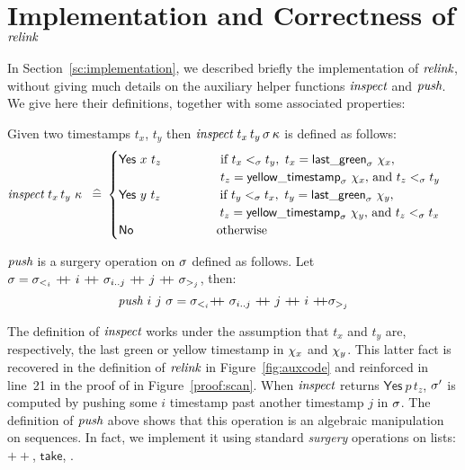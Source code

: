 \section{Implementation and Correctness of $\textit{relink}$}
\label{sc:relink-lemmas}
\def\cat{{\mathrel{+\!\!+}}}

In Section~\ref{sc:implementation}, we described briefly the
implementation of $\textit{relink}$, without giving much details on the
auxiliary helper functions $\textit{inspect}$ and $\textit{push}$. We give
here their definitions, together with some associated properties:

\begin{definition}[inspect]\label{def:inspect}%
Given two timestamps $t_x$, $t_y$ then $\textit{inspect}\ t_x\, t_y\,
\sigma\, \kappa$ is defined as follows:
\begin{equation*}
\aux{inspect}\ t_x\, t_y\ \C\ \eqdef
\begin{cases}
  \mathsf{Yes}\ x\ t_z\ \qquad \qquad
      \begin{array}[t]{l}
      \textrm{if}\ t_x \tle t_y,\ t_x = \mathsf{last\_green}_\ordlist\ \histx, \\
       t_z = \mathsf{yellow\_timestamp}_\ordlist\ \histx,\,
       \textrm{and} \ t_z \tle t_y
      \end{array} \\[5pt]
  \mathsf{Yes}\ y\ t_z\ \qquad \qquad
      \begin{array}[t]{l}
      \textrm{if}\ t_y \tle t_x,\ t_y = \mathsf{last\_green}_\ordlist\ \histy, \\
       t_z = \mathsf{yellow\_timestamp}_\ordlist\ \histy,\,
       \textrm{and} \ t_z \tle t_x
      \end{array} \\[5pt]
  \mathsf{No}\hphantom{\mathsf{s}\ x\ t_z}\ \qquad \qquad \textrm{otherwise}
\end{cases}
\end{equation*}
\end{definition}

\begin{definition}[push]\label{def:push}%
 $\textit{push}$ is a surgery operation on $\sigma$ defined as
  follows. Let $ \ordlist = \ordlist_{<_i}\ \cat
  \ i\ \cat\ \ordlist_{i..j}\ \cat\ j\ \cat\ \ordlist_{>_j} $, then:
\[
\aux{push}\ i\ j\ \ordlist = \ordlist_{<_i} \cat\  \ordlist_{i..j}\
\cat\ j\ \cat\ i\ \cat \ordlist_{>_j}
\]
\end{definition}

The definition of $\textit{inspect}$ works under the assumption that
$t_x$ and $t_y$ are, respectively, the last green or yellow timestamp
in $\chi_x$ and $\chi_y$. This latter fact is recovered in the
definition of $\textit{relink}$ in Figure~\ref{fig:auxcode} and
reinforced in line~21 in the proof of {\jyscan} in
Figure~\ref{proof:scan}. When $\textit{inspect}$ returns
$\mathsf{Yes}\ p\, t_z$, $\sigma'$ is computed by pushing some $i$
timestamp past another timestamp $j$ in $\sigma$. The definition of
$\textit{push}$ above shows that this operation is an algebraic
manipulation on sequences. In fact, we implement it using standard
{\it surgery} operations on lists: $\cat$, $\mathsf{take}$, \etc.

